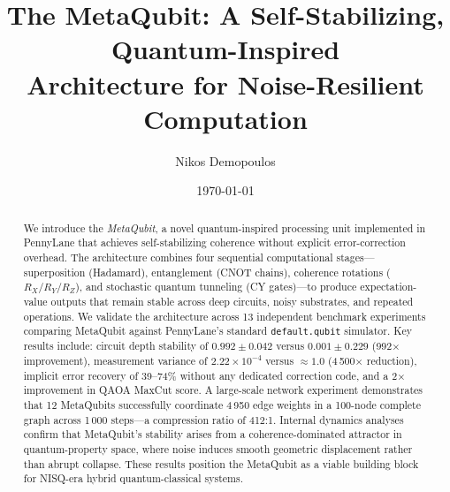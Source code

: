 \documentclass[twocolumn,amsmath,amssymb,prl]{revtex4-2}
\begin{document}
\title{The MetaQubit: A Self-Stabilizing, Quantum-Inspired\\
       Architecture for Noise-Resilient Computation}

\author{Nikos Demopoulos}

\date{\today}

\begin{abstract}
We introduce the \emph{MetaQubit}, a novel quantum-inspired processing unit
implemented in PennyLane that achieves self-stabilizing coherence without
explicit error-correction overhead.  The architecture combines four sequential
computational stages—superposition (Hadamard), entanglement (CNOT chains),
coherence rotations ($R_X / R_Y / R_Z$), and stochastic quantum tunneling
(CY gates)—to produce expectation-value outputs that remain stable across deep
circuits, noisy substrates, and repeated operations.  We validate the
architecture across 13 independent benchmark experiments comparing MetaQubit
against PennyLane's standard \texttt{default.qubit} simulator.  Key results
include: circuit depth stability of $0.992 \pm 0.042$ versus $0.001 \pm 0.229$
(992$\times$ improvement), measurement variance of $2.22\!\times\!10^{-4}$
versus $\approx 1.0$ (4\,500$\times$ reduction), implicit error recovery of
39--74\% without any dedicated correction code, and a 2$\times$ improvement in
QAOA MaxCut score.  A large-scale network experiment demonstrates that 12
MetaQubits successfully coordinate 4\,950 edge weights in a 100-node complete
graph across 1\,000 steps—a compression ratio of 412:1.  Internal dynamics
analyses confirm that MetaQubit's stability arises from a coherence-dominated
attractor in quantum-property space, where noise induces smooth geometric
displacement rather than abrupt collapse.  These results position the MetaQubit
as a viable building block for NISQ-era hybrid quantum-classical systems.
\end{abstract}


\maketitle

\end{document}
